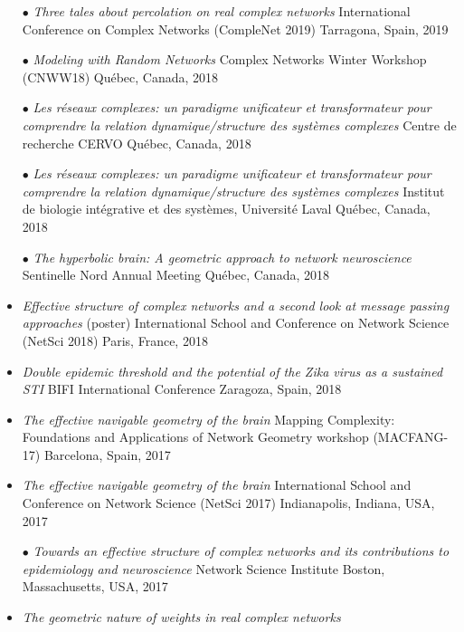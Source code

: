 \documentclass[11pt]{article}
\begin{document}
\begin{itemize}[itemsep=0.5em]
  \item[$\bullet$] \textit{Three tales about percolation on real complex networks}\split
  International Conference on Complex Networks (CompleNet 2019)\split
  Tarragona, Spain, 2019
%
  \item[$\bullet$] \textit{Modeling with Random Networks}\split
  Complex Networks Winter Workshop (CNWW18)\split
  Qu\'ebec, Canada, 2018
%
  \item[$\bullet$] \textit{Les réseaux complexes: un paradigme unificateur et transformateur pour comprendre la relation dynamique/structure des systèmes complexes}\split
  Centre de recherche CERVO\split
  Qu\'ebec, Canada, 2018
%
  \item[$\bullet$] \textit{Les réseaux complexes: un paradigme unificateur et transformateur pour comprendre la relation dynamique/structure des systèmes complexes}\split
  Institut de biologie intégrative et des systèmes, Université Laval\split
  Qu\'ebec, Canada, 2018
%
  \item[$\bullet$] \textit{The hyperbolic brain: A geometric approach to network neuroscience}\split
  Sentinelle Nord Annual Meeting\split
  Qu\'ebec, Canada, 2018
%
  \item \textit{Effective structure of complex networks and a second look at message passing approaches} (poster)\split
  International School and Conference on Network Science (NetSci 2018)\split
  Paris, France, 2018
%
  \item \textit{Double epidemic threshold and the potential of the Zika virus as a sustained STI}\split
  BIFI International Conference\split
  Zaragoza, Spain, 2018
%
  \item \textit{The effective navigable geometry of the brain}\split
  Mapping Complexity: Foundations and Applications of Network Geometry workshop (MACFANG-17)\split
  Barcelona, Spain, 2017
%
  \item \textit{The effective navigable geometry of the brain}\split
  International School and Conference on Network Science (NetSci 2017)\split
  Indianapolis, Indiana, USA, 2017
%
  \item[$\bullet$] \textit{Towards an effective structure of complex networks and its contributions to epidemiology and neuroscience}\split
  Network Science Institute\split
  Boston, Massachusetts, USA, 2017
%
  \item \textit{The geometric nature of weights in real complex networks}\split

\end{itemize}
\end{document}
